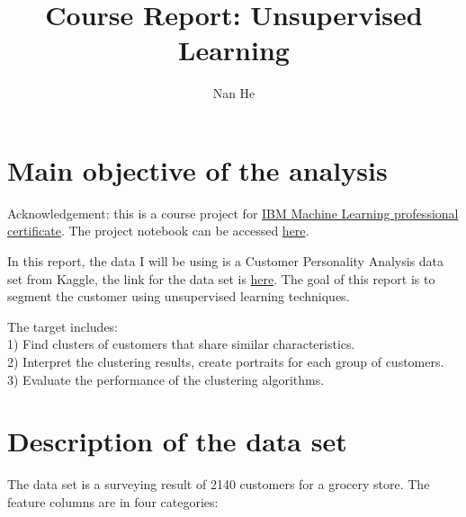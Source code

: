 \documentclass[11pt]{article}
\title{Course Report: Unsupervised Learning}
\author{Nan He}
\date{}
\begin{document}
\maketitle


\section{Main objective of the analysis}\label{section-introduction-1}
Acknowledgement: this is a course project for \href{https://www.coursera.org/professional-certificates/ibm-machine-learning}{IBM Machine Learning professional certificate}. The project notebook can be accessed \href{https://github.com/henankf223/Assignment_3/blob/cddb6fe0d2dcb9b413ce74028301c65b87316e8b/Assignment_Classification.ipynb}{here}.

In this report, the data I will be using is a Customer Personality Analysis data set from Kaggle, the link for the data set is \href{https://www.kaggle.com/imakash3011/customer-personality-analysis}{here}.
The goal of this report is to segment the customer using unsupervised learning techniques. 

The target includes: \\
1) Find clusters of customers that share similar characteristics. \\
2) Interpret the clustering results, create portraits for each group of customers. \\
3) Evaluate the performance of the clustering algorithms. \\

\section{Description of the data set}\label{section-introduction-2}
The data set is a surveying result of 2140 customers for a grocery store. 
The feature columns are in four categories:
\end{document}
